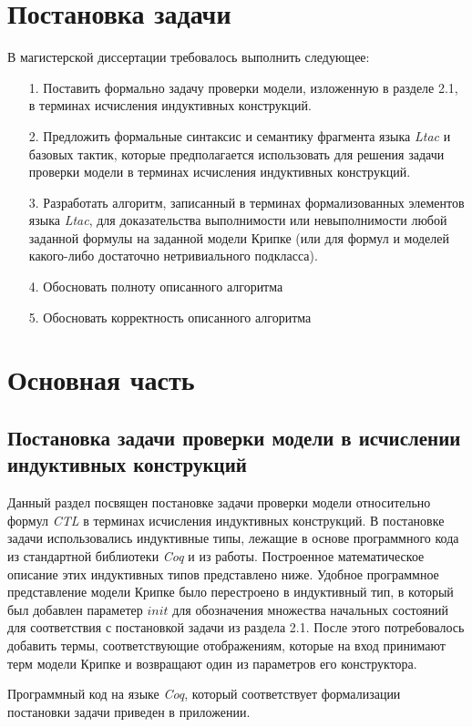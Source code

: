 \documentclass[12pt]{article}
\begin{document}
\newpage
\section{Постановка задачи}
В магистерской диссертации требовалось выполнить следующее:
\begin{enumerate}
    \item [1.] Поставить формально задачу проверки модели, изложенную в разделе 2.1, в терминах исчисления индуктивных конструкций.
    \item [2.] Предложить формальные синтаксис и семантику фрагмента языка \textit{Ltac} и базовых тактик, которые предполагается использовать для решения задачи проверки модели в терминах исчисления индуктивных конструкций.
    \item [3.] Разработать алгоритм, записанный в терминах формализованных элементов языка \textit{Ltac},  для доказательства выполнимости или невыполнимости любой заданной формулы на заданной модели Крипке (или для формул и моделей какого-либо достаточно нетривиального подкласса).
    \item[4.] Обосновать полноту описанного алгоритма
    \item[5.] Обосновать корректность описанного алгоритма
\end{enumerate}  
\section{Основная часть}
\subsection{Постановка задачи проверки модели в исчислении индуктивных конструкций}
Данный раздел посвящен постановке задачи проверки модели относительно формул \textit{CTL} в терминах исчисления индуктивных конструкций. 
В постановке задачи использовались индуктивные типы, лежащие в основе программного кода из стандартной библиотеки\cite{lib} \textit{Coq} и из работы\cite{thesis}\cite{thesisgithub}. Построенное математическое описание этих индуктивных типов представлено ниже. Удобное программное представление модели Крипке было перестроено в индуктивный тип, в который был добавлен параметер $init$ для обозначения множества начальных состояний для соответствия с постановкой задачи из раздела 2.1. После этого потребовалось добавить термы, соответствующие отображениям, которые на вход принимают терм модели Крипке и возвращают один из параметров его конструктора.

Программный код на языке \textit{Coq}, который соответствует формализации постановки задачи приведен в приложении. 
\end{document}

